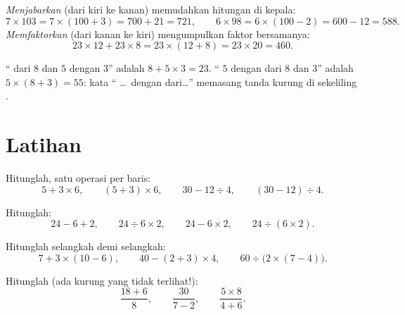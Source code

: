 \begin{example}\label{ex:g7:priorities:distributivity}
\emph{Menjabarkan} (dari kiri ke kanan) memudahkan hitungan di kepala:
\[
7 \times 103 = 7 \times (100 + 3) = 700 + 21 = 721,
\qquad
6 \times 98 = 6 \times (100 - 2) = 600 - 12 = 588 .
\]
\emph{Memfaktorkan} (dari kanan ke kiri) mengumpulkan faktor bersamanya:
\[
23 \times 12 + 23 \times 8 = 23 \times (12 + 8) = 23 \times 20 = 460 .
\]
\end{example}

\begin{example}\label{ex:g7:priorities:words}
`` dari $8$ dan  $5$ dengan $3$'' adalah
$8 + 5 \times 3 = 23$. `` $5$ dengan  dari $8$ dan
$3$'' adalah $5 \times (8 + 3) = 55$: kata `` \dots\ dengan
 dari\dots'' memasang tanda kurung di sekeliling .
\end{example}

\section{Latihan}

\begin{exercise}[$\star$]\label{exo:g7:priorities:1}
Hitunglah, satu operasi per baris:
\[
5 + 3 \times 6, \qquad
(5 + 3) \times 6, \qquad
30 - 12 \div 4, \qquad
(30 - 12) \div 4 .
\]
\end{exercise}

\begin{exercise}[$\star$]\label{exo:g7:priorities:2}
Hitunglah:
\[
24 - 6 + 2, \qquad
24 \div 6 \times 2, \qquad
24 - 6 \times 2, \qquad
24 \div (6 \times 2).
\]
\end{exercise}

\begin{exercise}[$\star$]\label{exo:g7:priorities:3}
Hitunglah selangkah demi selangkah:
\[
7 + 3 \times (10 - 6), \qquad
40 - (2 + 3) \times 4, \qquad
60 \div \bigl(2 \times (7 - 4)\bigr).
\]
\end{exercise}

\begin{exercise}[$\star$]\label{exo:g7:priorities:4}
Hitunglah  (ada kurung yang tidak terlihat!):
\[
\frac{18 + 6}{8}, \qquad
\frac{30}{7 - 2}, \qquad
\frac{5 \times 8}{4 + 6} .
\]
\end{exercise}

